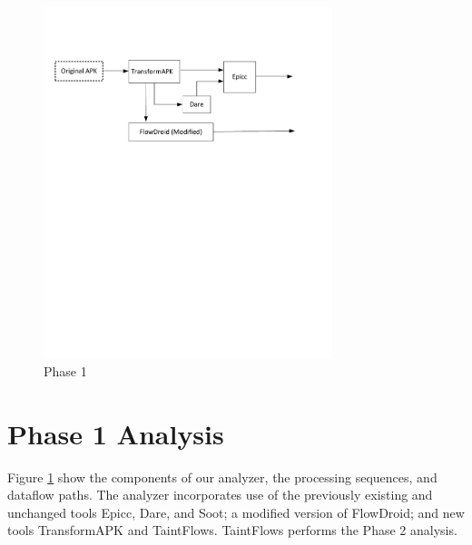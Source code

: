 {%
\begin{figure}[b!]
\center
\includegraphics[trim = 5mm 125mm 10mm 25mm, clip, width=0.75\textwidth]{phaseOne_v9.pdf}
\caption{Phase 1}
\label{fig:phase1}
\end{figure}

\section{Phase 1 Analysis}\label{subsec:phase1}
Figure \ref{fig:phase1} %
show the components of
our analyzer, the processing sequences, and dataflow
paths. The analyzer incorporates use of the previously
existing and unchanged tools Epicc, Dare, and Soot; a modified
version of FlowDroid; and new tools TransformAPK and TaintFlows.
TaintFlows performs the Phase 2 analysis.%
}
